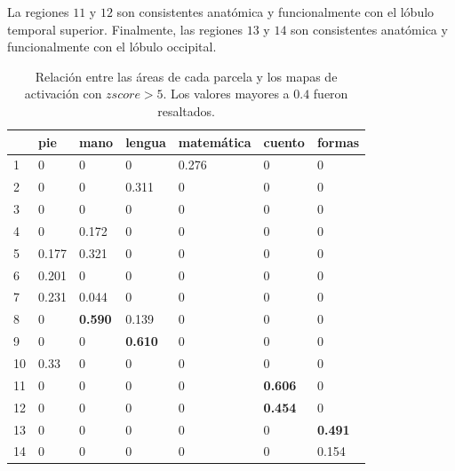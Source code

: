   La regiones $11$ y $12$ son
consistentes anat\'omica y funcionalmente con el l\'obulo temporal superior.
Finalmente, las regiones $13$ y $14$ son consistentes anat\'omica y funcionalmente
con el l\'obulo occipital.



\begin{table}[]
\centering
\label{tb:zscore5}
\begin{tabular}{|l|l|l|l|l|l|l|}
\hline
   & pie   & mano  & lengua & matemática & cuento & formas \\ \hline
1  & 0     & 0     & 0      & 0.276      & 0      & 0      \\ \hline
2  & 0     & 0     & 0.311  & 0          & 0      & 0      \\ \hline
3  & 0     & 0     & 0      & 0          & 0      & 0      \\ \hline
4  & 0     & 0.172 & 0      & 0          & 0      & 0      \\ \hline
5  & 0.177 & 0.321 & 0      & 0          & 0      & 0      \\ \hline
6  & 0.201 & 0     & 0      & 0          & 0      & 0      \\ \hline
7  & 0.231 & 0.044 & 0      & 0          & 0      & 0      \\ \hline
8  & 0     & {\bf 0.590} & 0.139  & 0          & 0      & 0      \\ \hline
9  & 0     & 0     & {\bf 0.610}   & 0          & 0      & 0      \\ \hline
10 & 0.33  & 0     & 0      & 0          & 0      & 0      \\ \hline
11 & 0     & 0     & 0      & 0          & {\bf 0.606}  & 0      \\ \hline
12 & 0     & 0     & 0      & 0          & {\bf 0.454}  & 0      \\ \hline
13 & 0     & 0     & 0      & 0          & 0      & {\bf 0.491}  \\ \hline
14 & 0     & 0     & 0      & 0          & 0      & 0.154  \\ \hline
\end{tabular}

\caption{Relaci\'on entre las \'areas de cada parcela y los mapas de
         activaci\'on con $zscore > 5$. Los valores mayores a $0.4$ fueron
         resaltados.}
\end{table}


